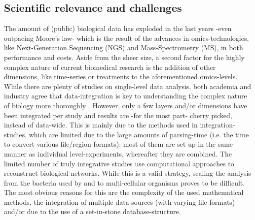 \documentclass[twoside,fontsize=10pt]{article}
\begin{document}
\subsection*{Scientific relevance and challenges} %
The amount of (public) biological data has exploded in the last years -even outpacing Moore's law- which is the result of the advances in omics-technologies, like Next-Generation Sequencing (NGS) and Mass-Spectrometry (MS), in both performance and costs. Aside from the sheer size, a second factor for the highly complex nature of current biomedical research is the addition of other dimensions, like time-series or treatments to the aforementioned omics-levels. While there are plenty of studies on single-level data analysis, both academia and industry agree that data-integration is key to understanding the complex nature of biology more thoroughly \citep{Gomez-Cabrero2014, Huttenhower2010, Searls2005, Hamid2009}. However, only a few layers and/or dimensions have been integrated per study and results are -for the most part- cherry picked, instead of data-wide. This is mainly due to the methods used in integration-studies, which are limited due to the large amounts of parsing-time (i.e. the time to convert various file/region-formats): most of them are set up in the same manner as individual level-experiments, whereafter they are combined. The limited number of truly integrative studies use computational approaches to reconstruct biological networks. While this is a valid strategy, scaling the analysis from the bacteria used by \citet{Karr2012} and \citet{Lerman2012} to multi-cellular organisms proves to be difficult. The most obvious reasons for this are the complexity of the used mathematical methods, the integration of multiple data-sources (with varying file-formats) and/or due to the use of a set-in-stone database-structure. 
\medskip
\end{document}
